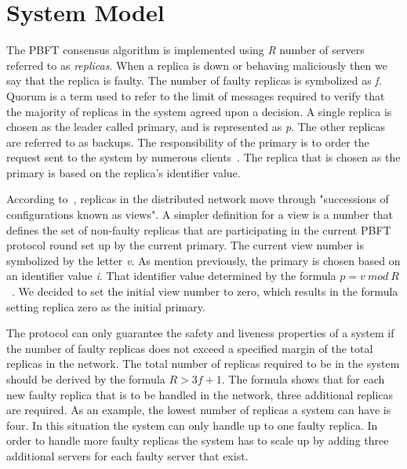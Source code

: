 \section{System Model}
\label{sec:systemModel}
The PBFT consensus algorithm is implemented using \emph{R} number of servers referred to as \emph{replicas}. When a replica is down or behaving maliciously then we say that the replica is faulty. The number of faulty replicas is symbolized as \emph{f}. 
Quorum is a term used to refer to the limit of messages required to verify that the majority of replicas in the system agreed upon a decision\cites[p.~408-409]{PAPER:PBFTRecovery}. %
A single replica is chosen as the leader called primary, and is represented as \emph{p}. The other replicas are referred to as backups. The responsibility of the primary is to order the request sent to the system by numerous clients~\cites[p.~456]{BOOK:MVstandver3}[p.~405]{PAPER:PBFTRecovery}. The replica that is chosen as the primary is based on the replica's identifier value.

According to~\cites[p.~3]{PAPER:OGPBFT}[p.~405]{PAPER:PBFTRecovery}, replicas in the distributed network move through "successions of configurations known as views". A simpler definition for a view is a number that defines the set of non-faulty replicas that are participating in the current PBFT protocol round set up by the current primary. The current view number is symbolized by the letter \emph{v}.
As mention previously, the primary is chosen based on an identifier value \emph{i}. That identifier value determined by the formula $p = v ~mod~ R$~\cites[p.~258]{BOOK:BuildDepDistSyst}[p.~3]{PAPER:OGPBFT} {SLIDES:PBFT}. 
We decided to set the initial view number to zero, which results in the formula setting replica zero as the initial primary.

The protocol can only guarantee the safety and liveness properties of a system if the number of faulty replicas does not exceed a specified margin of the total replicas in the network. The total number of replicas required to be in the system should be derived by the formula $R > 3f + 1$.
The formula shows that for each new faulty replica that is to be handled in the network, three additional replicas are required. As an example, the lowest number of replicas a system can have is four. In this situation the system can only handle up to one faulty replica. In order to handle more faulty replicas the system has to scale up by adding three additional servers for each faulty server that exist\cites[p.~257]{BOOK:BuildDepDistSyst}[p.~403]{PAPER:PBFTRecovery}{SLIDES:PBFT}[p.~3]{PAPER:OGPBFT}.

